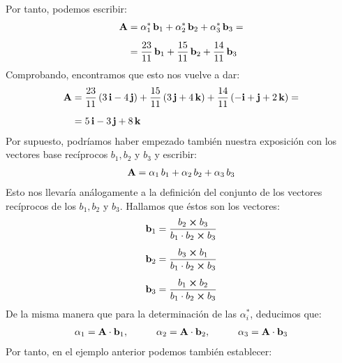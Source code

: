Por tanto, podemos escribir:
\begin{eqnarray*}
\begin{aligned}
\vb{A} &= \alpha_{1}^{*} \, \vb{b}_{1} + \alpha_{2}^{*} \, \vb{b}_{2} + \alpha_{3}^{*} \, \vb{b}_{3} = \\[0.5em]
&= \dfrac{23}{11} \, \vb{b}_{1} + \dfrac{15}{11} \, \vb{b}_{2} + \dfrac{14}{11} \, \vb{b}_{3}
\end{aligned}
\end{eqnarray*}
Comprobando, encontramos que esto nos vuelve a dar:
\begin{eqnarray*}
\begin{aligned}
\vb{A} &= \dfrac{23}{11} \left( 3 \, \vb{i} - 4 \, \vb{j} \right) + \dfrac{15}{11} \left( 3 \, \vb{j} + 4 \, \vb{k} \right) + \dfrac{14}{11} \left( -\vb{i} + \vb{j} + 2 \, \vb{k} \right) = \\[0.5em]
&= 5 \, \vb{i} - 3 \, \vb{j} + 8 \, \vb{k}
\end{aligned}
\end{eqnarray*}
Por supuesto, podríamos haber empezado también nuestra exposición con los vectores base recíprocos $b_{1}, b_{2}$ y $b_{3}$ y escribir:
\begin{align}
    \vb{A} = \alpha_{1} \, b_{1} + \alpha_{2} \, b_{2} + \alpha_{3} \, b_{3}
    \label{eq:ecuacion_01_42}
\end{align}
Esto nos llevaría análogamente a la definición del conjunto de los vectores recíprocos de los $b_{1}, b_{2}$ y $b_{3}$. Hallamos que éstos son los vectores:
\begin{align}
\begin{aligned}
    \vb{b}_{1} &= \dfrac{b_{2} \cp b_{3} }{b_{1} \cdot b_{2} \cp b_{3} } \\[0.5em]
    \vb{b}_{2} &= \dfrac{b_{3} \cp b_{1}}{b_{1} \cdot b_{2} \cp b_{3} } \\[0.5em]
    \vb{b}_{3} &= \dfrac{b_{1} \cp b_{2}}{b_{1} \cdot b_{2} \cp b_{3} }
\end{aligned}
\label{eq:ecuacion_01_43}
\end{align}
De la misma manera que para la determinación de las $\alpha_{i}^{*}$, deducimos que:
\begin{align}
    \alpha_{1} = \vb{A} \cdot \vb{b}_{1}, \hspace{1cm} \alpha_{2} = \vb{A} \cdot \vb{b}_{2}, \hspace{1cm} \alpha_{3} = \vb{A} \cdot \vb{b}_{3}
    \label{eq:ecuacion_01_44}
\end{align}
Por tanto, en el ejemplo anterior podemos también establecer:
